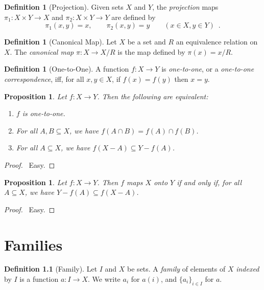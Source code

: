 \documentclass{report}
\let\qed\relax
\newtheorem{prop}[ax]{Proposition}
\theoremstyle{definition}
\newtheorem{df}[ax]{Definition}
\begin{document}
\begin{df}[Projection]
Given sets $X$ and $Y$, the \emph{projection} maps $\pi_1 : X \times Y \rightarrow X$ and $\pi_2 : X \times Y \rightarrow Y$ are defined by
\[ \pi_1(x,y) = x, \qquad \pi_2(x,y) = y \qquad (x \in X, y \in Y) \enspace . \]
\end{df}

\begin{df}[Canonical Map]
Let $X$ be a set and $R$ an equivalence relation on $X$. The \emph{canonical map} $\pi : X \rightarrow X / R$ is the map defined by $\pi(x) = x / R$.
\end{df}

\begin{df}[One-to-One]
A function $f : X \rightarrow Y$ is \emph{one-to-one}, or a \emph{one-to-one correspondence}, iff, for all $x,y \in X$, if $f(x) = f(y)$ then $x = y$.
\end{df}

\begin{prop}
Let $f : X \rightarrow Y$. Then the following are equivalent:
\begin{enumerate}
\item $f$ is one-to-one.
\item For all $A,B \subseteq X$, we have $f(A \cap B) = f(A) \cap f(B)$.
\item For all $A \subseteq X$, we have $f(X-A) \subseteq Y - f(A)$.
\end{enumerate}
\end{prop}

\begin{proof}
\pf\ Easy. \qed
\end{proof}

\begin{prop}
Let $f : X \rightarrow Y$. Then $f$ maps $X$ onto $Y$ if and only if, for all $A \subseteq X$, we have $Y - f(A) \subseteq f(X-A)$.
\end{prop}

\begin{proof}
\pf\ Easy. \qed
\end{proof}

\chapter{Families}

\begin{df}[Family]
Let $I$ and $X$ be sets. A \emph{family} of elements of $X$ \emph{indexed} by $I$ is a function $a : I \rightarrow X$. We write $a_i$ for $a(i)$, and $\{a_i\}_{i \in I}$ for $a$.
\end{df}
\end{document}
